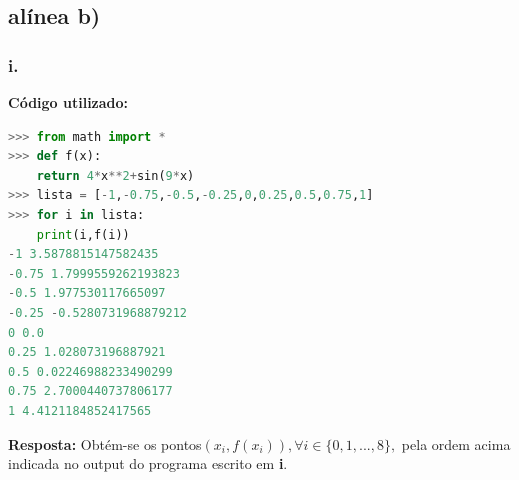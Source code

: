 \documentclass{article}
\begin{document}
\subsection*{alínea b)}
\subsubsection*{i.}
\textbf{Código utilizado:}
\begin{lstlisting}[language=Python]
>>> from math import *
>>> def f(x):
    return 4*x**2+sin(9*x)
>>> lista = [-1,-0.75,-0.5,-0.25,0,0.25,0.5,0.75,1]
>>> for i in lista:
    print(i,f(i))
-1 3.5878815147582435
-0.75 1.7999559262193823
-0.5 1.977530117665097
-0.25 -0.5280731968879212
0 0.0
0.25 1.028073196887921
0.5 0.02246988233490299
0.75 2.7000440737806177
1 4.4121184852417565
\end{lstlisting}
\textbf{Resposta:} Obtém-se os pontos$(x_{i},f(x_{i})), \forall i \in \{0,1,...,8\},$ pela ordem acima indicada no output do programa escrito em \textbf{i}.
\end{document}
